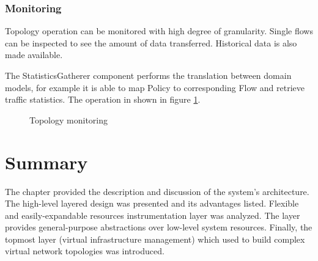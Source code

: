 \documentclass[11pt,openany]{book}
\begin{document}
        \subsubsection{Monitoring}

          Topology operation can be monitored with high degree of granularity. Single flows can be inspected to see the
          amount of data transferred. Historical data is also made available.

          The StatisticsGatherer component performs the translation between domain models, for example it is able to map
          Policy to corresponding Flow and retrieve traffic statistics. The operation in shown in figure
          \ref{fig:arch:seqmon}.

          \begin{figure}[H]
            \centering


            \caption{Topology monitoring}
            \label{fig:arch:seqmon}
          \end{figure}


    \section*{Summary}

      The chapter provided the description and discussion of the system's architecture. The high-level layered design
      was presented and its advantages listed. Flexible and easily-expandable resources instrumentation layer was
      analyzed. The layer provides general-purpose abstractions over low-level system resources.  Finally, the topmost
      layer (virtual infrastructure management) which used to build complex virtual network topologies was introduced.
\end{document}
